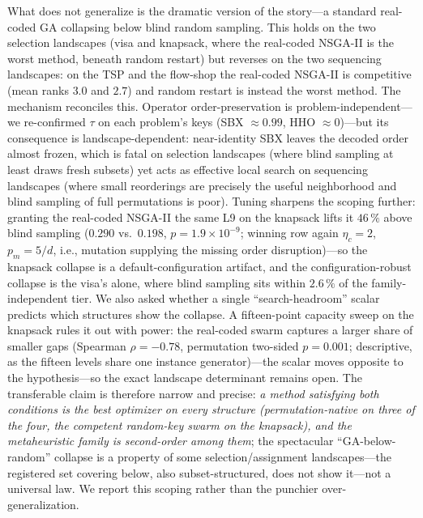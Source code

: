 \documentclass[runningheads]{llncs}
\begin{document}
What does not generalize is the dramatic version of the story---a standard real-coded GA collapsing below blind random sampling. This holds on the two selection landscapes (visa and knapsack, where the real-coded NSGA-II is the worst method, beneath random restart) but reverses on the two sequencing landscapes: on the TSP and the flow-shop the real-coded NSGA-II is competitive (mean ranks $3.0$ and $2.7$) and random restart is instead the worst method. The mechanism reconciles this. Operator order-preservation is problem-independent---we re-confirmed $\tau$ on each problem's keys (SBX ${\approx}0.99$, HHO ${\approx}0$)---but its consequence is landscape-dependent: near-identity SBX leaves the decoded order almost frozen, which is fatal on selection landscapes (where blind sampling at least draws fresh subsets) yet acts as effective local search on sequencing landscapes (where small reorderings are precisely the useful neighborhood and blind sampling of full permutations is poor). Tuning sharpens the scoping further: granting the real-coded NSGA-II the same L9 on the knapsack lifts it $46\,\%$ above blind sampling ($0.290$ vs.\ $0.198$, $p=1.9\times10^{-9}$; winning row again $\eta_c{=}2$, $p_m{=}5/d$, i.e., mutation supplying the missing order disruption)---so the knapsack collapse is a default-configuration artifact, and the configuration-robust collapse is the visa's alone, where blind sampling sits within $2.6\,\%$ of the family-independent tier. We also asked whether a single ``search-headroom'' scalar predicts which structures show the collapse. A fifteen-point capacity sweep on the knapsack rules it out with power: the real-coded swarm captures a larger share of smaller gaps (Spearman $\rho=-0.78$, permutation two-sided $p=0.001$; descriptive, as the fifteen levels share one instance generator)---the scalar moves opposite to the hypothesis---so the exact landscape determinant remains open. The transferable claim is therefore narrow and precise: \emph{a method satisfying both conditions is the best optimizer on every structure (permutation-native on three of the four, the competent random-key swarm on the knapsack), and the metaheuristic family is second-order among them}; the spectacular ``GA-below-random'' collapse is a property of some selection/assignment landscapes---the registered set covering below, also subset-structured, does not show it---not a universal law. We report this scoping rather than the punchier over-generalization.
\end{document}
